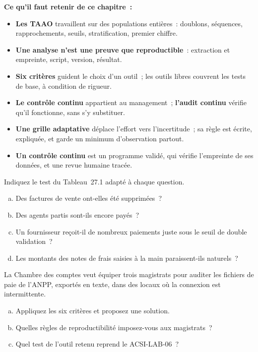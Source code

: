 \separateur

\begin{boxresume}
\textbf{Ce qu'il faut retenir de ce chapitre~:}
\begin{itemize}
    \item \textbf{Les TAAO} travaillent sur des populations entières~:
          doublons, séquences, rapprochements, seuils, stratification,
          premier chiffre.
    \item \textbf{Une analyse n'est une preuve que reproductible}~:
          extraction et empreinte, script, version, résultat.
    \item \textbf{Six critères} guident le choix d'un outil~; les outils
          libres couvrent les tests de base, à condition de rigueur.
    \item \textbf{Le contrôle continu} appartient au management~;
          \textbf{l'audit continu} vérifie qu'il fonctionne, sans s'y
          substituer.
    \item \textbf{Une grille adaptative} déplace l'effort vers
          l'incertitude~; sa règle est écrite, expliquée, et garde un
          minimum d'observation partout.
    \item \textbf{Un contrôle continu} est un programme validé, qui vérifie l'empreinte de ses données, et une revue humaine tracée.
\end{itemize}
\end{boxresume}

\bigskip

\begin{boxexo}[title={\ding{45}\quad Exercice~27.1. Quel test~? \niveaubase}]
Indiquez le test du Tableau~27.1 adapté à chaque question.
\begin{enumerate}[(a)]
    \item Des factures de vente ont-elles été supprimées~?
    \item Des agents partis sont-ils encore payés~?
    \item Un fournisseur reçoit-il de nombreux paiements juste sous le seuil
          de double validation~?
    \item Les montants des notes de frais saisies à la main paraissent-ils
          naturels~?
\end{enumerate}
\end{boxexo}

\begin{boxexo}[title={\ding{45}\quad Exercice~27.2. Choisir un outil pour l'ANPP \niveaumoyen}]
La Chambre des comptes veut équiper trois magistrats pour auditer les
fichiers de paie de l'ANPP, exportés en texte, dans des locaux où la
connexion est intermittente.
\begin{enumerate}[(a)]
    \item Appliquez les six critères et proposez une solution.
    \item Quelles règles de reproductibilité imposez-vous aux magistrats~?
    \item Quel test de l'outil retenu reprend le ACSI-LAB-06~?
\end{enumerate}
\end{boxexo}

